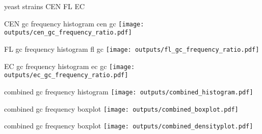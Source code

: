 \documentclass{beamer}
\begin{document}
\begin{frame} {yeast strains}
    CEN
    FL
    EC
\end{frame}

\begin{frame} {CEN gc frequency histogram}
    cen gc
    \texttt{[image: outputs/cen\_gc\_frequency\_ratio.pdf]}
\end{frame}

\begin{frame} {FL gc frequency histogram}
    fl gc
    \texttt{[image: outputs/fl\_gc\_frequency\_ratio.pdf]}
\end{frame}

\begin{frame} {EC gc frequency histogram}
    ec gc
    \texttt{[image: outputs/ec\_gc\_frequency\_ratio.pdf]}
\end{frame}

\begin{frame} {combined gc frequency histogram}
    \texttt{[image: outputs/combined\_histogram.pdf]}
\end{frame}

\begin{frame} {combined gc frequency boxplot}
    \texttt{[image: outputs/combined\_boxplot.pdf]}
\end{frame}

\begin{frame} {combined gc frequency boxplot}
    \texttt{[image: outputs/combined\_densityplot.pdf]}
\end{frame}
\end{document}
